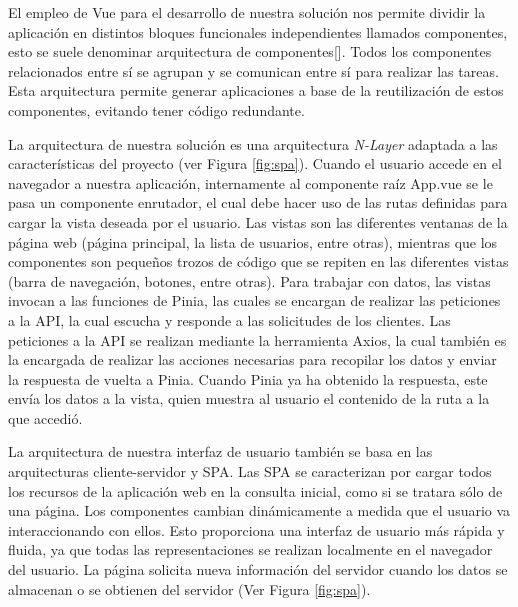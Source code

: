 El empleo de Vue para el desarrollo de nuestra solución nos permite dividir la aplicación en distintos bloques funcionales independientes llamados componentes, esto se suele denominar arquitectura de componentes[\cite{50}]. Todos los componentes relacionados entre sí se agrupan y se comunican entre sí para realizar las tareas. Esta arquitectura permite generar aplicaciones a base de la reutilización de estos componentes, evitando tener código redundante.

La arquitectura de nuestra solución es una arquitectura \textit{N-Layer} adaptada a las características del proyecto (ver Figura \ref{fig:spa}). Cuando el usuario accede en el navegador a nuestra aplicación, internamente al componente raíz App.vue se le pasa un componente enrutador, el cual debe hacer uso de las rutas definidas para cargar la vista deseada por el usuario. Las vistas son las diferentes ventanas de la página web (página principal, la lista de usuarios, entre otras), mientras que los componentes son pequeños trozos de código que se repiten en las diferentes vistas (barra de navegación, botones, entre otras). Para trabajar con datos, las vistas invocan a las funciones de Pinia, las cuales se encargan de realizar las peticiones a la API, la cual escucha y responde a las solicitudes de los clientes. Las peticiones a la API se realizan mediante la herramienta Axios, la cual también es la encargada de realizar las acciones necesarias para recopilar los datos y enviar la respuesta de vuelta a Pinia. Cuando Pinia ya ha obtenido la respuesta, este envía los datos a la vista, quien muestra al usuario el contenido de la ruta a la que accedió.



La arquitectura de nuestra interfaz de usuario también se basa en las arquitecturas cliente-servidor y SPA. Las SPA se caracterizan por cargar todos los recursos de la aplicación web en la consulta inicial, como si se tratara sólo de una página. Los componentes cambian dinámicamente a medida que el usuario va interaccionando con ellos. Esto proporciona una interfaz de usuario más rápida y fluida, ya que todas las representaciones se realizan localmente en el navegador del usuario. La página solicita nueva información del servidor cuando los datos se almacenan o se obtienen del servidor (Ver Figura \ref{fig:spa}).

